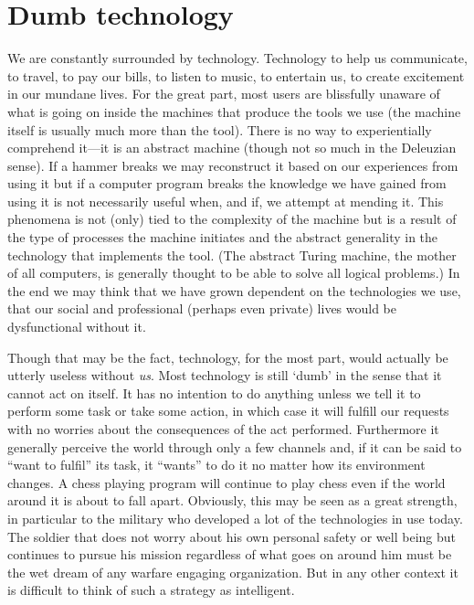 \section*{Dumb technology}
\label{sec:dumb-technology}

We are constantly surrounded by technology. Technology to help us
communicate, to travel, to pay our bills, to listen to music, to
entertain us, to create excitement in our mundane lives. For the great
part, most users are blissfully unaware of what is going on inside the
machines that produce the tools we use (the machine itself is usually
much more than the tool). There is no way to experientially comprehend
it---it is an abstract machine (though not so much in the Deleuzian
sense). If a hammer breaks we may reconstruct it based on our
experiences from using it but if a computer program breaks the
knowledge we have gained from using it is not necessarily useful when,
and if, we attempt at mending it. This phenomena is not (only) tied to
the complexity of the machine but is a result of the type of processes
the machine initiates and the abstract generality in the technology
that implements the tool. (The abstract Turing machine, the mother of
all computers, is generally thought to be able to solve all logical
problems.) In the end we may think that we have grown dependent on the
technologies we use, that our social and professional (perhaps even
private) lives would be dysfunctional without it.

Though that may be the fact, technology, for the most part, would
actually be utterly useless without \emph{us}. Most technology is
still `dumb' in the sense that it cannot act on itself. It has no
intention to do anything unless we tell it to perform some task or
take some action, in which case it will fulfill our requests with no
worries about the consequences of the act performed. Furthermore it
generally perceive the world through only a few channels and, if it
can be said to ``want to fulfil'' its task, it ``wants'' to do it no
matter how its environment changes. A chess playing program will
continue to play chess even if the world around it is about to fall
apart. Obviously, this may be seen as a great strength, in particular
to the military who developed a lot of the technologies in use
today. The soldier that does not worry about his own personal safety
or well being but continues to pursue his mission regardless of what
goes on around him must be the wet dream of any warfare engaging
organization. But in any other context it is difficult to think of
such a strategy as intelligent.

